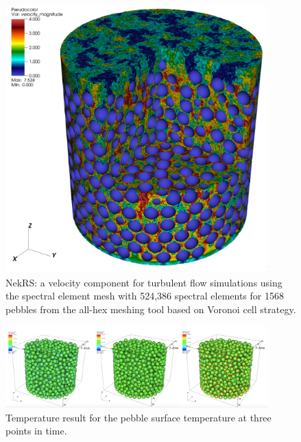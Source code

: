 \begin{figure}[!h]
\centering
\includegraphics[clip=true,width=0.9\textwidth]{Figures/ndemo_r3}
\caption{NekRS: a velocity component for turbulent flow simulations using the
spectral element mesh with 524,386 spectral elements for 1568 pebbles from the
all-hex meshing tool based on Voronoi cell strategy. } 
\label{f:ndemo3}
\end{figure}


\begin{figure}[!h]
\centering
\includegraphics[clip=true,width=0.9\textwidth]{Figures/ndemo_r4}
\caption{Temperature result for the pebble surface temperature at three points in time.}
\label{f:ndemo4}
\end{figure}

